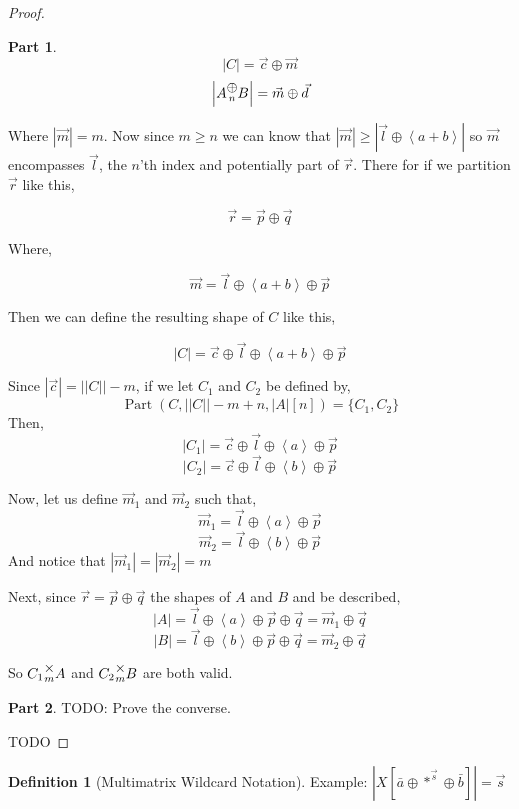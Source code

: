 \documentclass[12pt]{book}
\theoremstyle{plain}
\theoremstyle{definition}
\newtheorem{definition}{Definition}[chapter]
\theoremstyle{ppart}
\newtheorem{ppart}{Part}
\theoremstyle{case}
\theoremstyle{solution}
\DeclareMathOperator{\Part}{Part}
\newcommand{\mmult}[1]{\text{\raisebox{1ex}{$\underset{#1}{\times}$}}}
\newcommand{\mconcat}[1]{\text{\raisebox{1ex}{$\underset{#1}{\oplus}$}}}
\newcommand{\shape}[1]{\left|#1\right|}
\begin{document}
\begin{proof}
\begin{ppart}
\[ \shape{C} = \vec{c} \oplus \vec{m} \]
\[ \shape{A \mconcat{n} B} = \vec{m} \oplus \vec{d} \]

Where $\shape{\vec{m}} = m$. Now since $m \ge n$ we can know that
$\shape{\vec{m}} \ge \shape{\vec{l} \oplus \left<a+b\right>}$ 
so $\vec{m}$ encompasses $\vec{l}$, the $n$'th index and potentially part of $\vec{r}$.
There for if we partition $\vec{r}$ like this,

\[ \vec{r} = \vec{p} \oplus \vec{q} \]

Where,

\[ \vec{m} = \vec{l} \oplus \left<a+b\right> \oplus \vec{p} \]

Then we can define the resulting shape of $C$ like this,

\[ \shape{C} = \vec{c} \oplus \vec{l} \oplus \left<a+b\right> \oplus \vec{p} \]

Since $\shape{\vec{c}} = \shape{\shape{C}}-m$, if we let $C_1$ and $C_2$ be defined by,
\[ \Part(C, \shape{\shape{C}}-m+n, \shape{A}[n]) = \{C_1, C_2\} \]
Then,
\[ \shape{C_1} = \vec{c} \oplus \vec{l} \oplus \left<a\right> \oplus \vec{p} \]
\[ \shape{C_2} = \vec{c} \oplus \vec{l} \oplus \left<b\right> \oplus \vec{p} \]

Now, let us define $\vec{m}_1$ and $\vec{m}_2$ such that,
\[ \vec{m}_1 = \vec{l} \oplus \left<a\right> \oplus \vec{p} \]
\[ \vec{m}_2 = \vec{l} \oplus \left<b\right> \oplus \vec{p} \]
And notice that $\shape{\vec{m}_1} = \shape{\vec{m}_2} = m$

Next, since $\vec{r} = \vec{p} \oplus \vec{q}$ the shapes of $A$ and $B$ and be described,
\[ \shape{A} = \vec{l} \oplus \left<a\right> \oplus \vec{p} \oplus \vec{q} = \vec{m}_1 \oplus \vec{q} \]
\[ \shape{B} = \vec{l} \oplus \left<b\right> \oplus \vec{p} \oplus \vec{q} = \vec{m}_2 \oplus \vec{q} \]

So $C_1 \mmult{m} A$ and $C_2 \mmult{m} B$ are both valid.

\end{ppart}
\begin{ppart}
TODO: Prove the converse.
\end{ppart}

TODO
\end{proof}

\begin{definition}[Multimatrix Wildcard Notation]
Example:
$\shape{X[\bar{a} \oplus *^{\vec{s}} \oplus \bar{b}]} = \vec{s}$
\end{definition}
\end{document}
